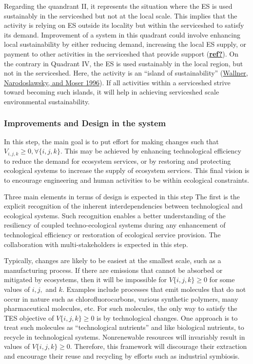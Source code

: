 \documentclass[
  14pt,
]{extarticle}
\begin{document}
Regarding the quandrant II, it represents the situation where the ES is used sustainably in the serviceshed but not at the local scale.
This implies that the activity is relying on ES outside its locality but within the serviceshed to satisfy its demand.
Improvement of a system in this quadrant could involve enhancing local sustainability by either reducing demand, increasing the local ES supply, or payment to other activities in the serviceshed that provide support (\protect\hyperlink{ref-ref}{\textbf{ref?}}).
On the contrary in Quadrant IV, the ES is used sustainably in the local region, but not in the serviceshed.
Here, the activity is an ``island of sustainability'' (\protect\hyperlink{ref-Wallner1996}{Wallner, Narodoslawsky, and Moser 1996}).
If all activities within a serviceshed strive toward becoming such islands, it will help in achieving serviceshed scale environmental sustainability.

\hypertarget{improvements-and-design-in-the-system}{%
\subsubsection{Improvements and Design in the system}\label{improvements-and-design-in-the-system}}

In this step, the main goal is to put effort for making changes such that \(V_{i,j,k} \geq 0, \forall\{i,j,k\}\).
This may be achieved by enhancing technological efficiency to reduce the demand for ecosystem services, or by restoring and protecting ecological systems to increase the supply of ecosystem services.
This final vision is to encourage engineering and human activities to be within ecological constraints.

Three main elements in terms of design is expected in this step
The first is the explicit recognition of the inherent interdependencies between technological and ecological systems.
Such recognition enables a better understanding of the resiliency of coupled techno-ecological systems during any enhancement of technological efficiency or restoration of ecological service provision.
The collaboration with multi-stakeholders is expected in this step.

Typically, changes are likely to be easiest at the smallest scale, such as a manufacturing process.
If there are emissions that cannot be absorbed or mitigated by ecosystems, then it will be impossible for \(V\{i,j,k\} \geq 0\) for some values of \(i, j,\) and \(k\).
Examples include processes that emit molecules that do not occur in nature such as chlorofluorocarbons, various synthetic polymers, many pharmaceutical molecules, etc.
For such molecules, the only way to satisfy the TES objective of \(V\{i,j,k\} \geq 0\) is by technological changes.
One approach is to treat such molecules as ``technological nutrients'' and like biological nutrients, to recycle in technological systems.
Nonrenewable resources will invariably result in values of \(V\{i,j,k\} \geq 0\).
Therefore, this framework will discourage their extraction and encourage their reuse and recycling by efforts such as industrial symbiosis.
\end{document}
